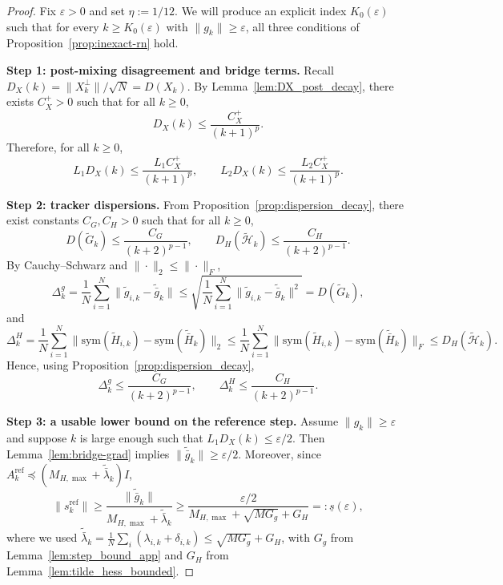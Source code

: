 \documentclass[11pt,a4paper]{article}
\begin{document}
\begin{proof}
Fix $\varepsilon>0$ and set $\eta:=1/12$.
We will produce an explicit index $K_0(\varepsilon)$ such that for every $k\ge K_0(\varepsilon)$ with $\|g_k\|\ge \varepsilon$,
all three conditions of Proposition~\ref{prop:inexact-rn} hold.

\smallskip
\noindent\textbf{Step 1: post-mixing disagreement and bridge terms.}
Recall $D_X(k)=\|X_k^\perp\|/\sqrt N = D(X_k)$.
By Lemma~\ref{lem:DX_post_decay}, there exists $C_X^{+}>0$ such that for all $k\ge 0$,
\begin{equation}\label{eq:DX_post_decay_app}
D_X(k)\le \frac{C_X^{+}}{(k+1)^p}.
\end{equation}
Therefore, for all $k\ge 0$,
\begin{equation}\label{eq:bridge_targets_app}
L_1D_X(k)\le \frac{L_1C_X^{+}}{(k+1)^p},
\qquad
L_2D_X(k)\le \frac{L_2C_X^{+}}{(k+1)^p}.
\end{equation}

\smallskip
\noindent\textbf{Step 2: tracker dispersions.}
From Proposition~\ref{prop:dispersion_decay}, there exist constants $C_G,C_H>0$ such that for all $k\ge 0$,
\begin{equation}\label{eq:GH_decay_app}
D(\tilde G_k)\le \frac{C_G}{(k+2)^{p-1}},
\qquad
D_H(\tilde{\mathcal H}_k)\le \frac{C_H}{(k+2)^{p-1}}.
\end{equation}
By Cauchy--Schwarz and $\|\cdot\|_2\le \|\cdot\|_F$,
\[
\Delta_k^g
=\frac1N\sum_{i=1}^N\|\tilde g_{i,k}-\tilde{\bar g}_k\|
\le \sqrt{\frac1N\sum_{i=1}^N\|\tilde g_{i,k}-\tilde{\bar g}_k\|^2}
= D(\tilde G_k),
\]
and
\[
\Delta_k^H
=\frac1N\sum_{i=1}^N\big\|\mathrm{sym}(\tilde H_{i,k})-\mathrm{sym}(\tilde{\bar H}_k)\big\|_2
\le \frac1N\sum_{i=1}^N\big\|\mathrm{sym}(\tilde H_{i,k})-\mathrm{sym}(\tilde{\bar H}_k)\big\|_F
\le D_H(\tilde{\mathcal H}_k).
\]
Hence, using Proposition~\ref{prop:dispersion_decay},
\begin{equation}\label{eq:Delta_decay_app}
\Delta_k^g\le \frac{C_G}{(k+2)^{p-1}},
\qquad
\Delta_k^H\le \frac{C_H}{(k+2)^{p-1}}.
\end{equation}

\smallskip
\noindent\textbf{Step 3: a usable lower bound on the reference step.}
Assume $\|g_k\|\ge \varepsilon$ and suppose $k$ is large enough such that $L_1D_X(k)\le \varepsilon/2$.
Then Lemma~\ref{lem:bridge-grad} implies
$\|\tilde{\bar g}_k\|\ge \varepsilon/2$.
Moreover, since $A_k^{\mathrm{ref}}\preceq (M_{H,\max}+\tilde{\bar\lambda}_k)I$,
\[
\|s_k^{\mathrm{ref}}\|
\ge \frac{\|\tilde{\bar g}_k\|}{M_{H,\max}+\tilde{\bar\lambda}_k}
\ge \frac{\varepsilon/2}{M_{H,\max}+\sqrt{MG_g}+G_H}
=:\underline s(\varepsilon),
\]
where we used $\tilde{\bar\lambda}_k=\frac{1}{N}\sum_i(\lambda_{i,k}+\delta_{i,k})\le \sqrt{MG_g}+G_H$, with $G_g$ from Lemma~\ref{lem:step_bound_app} and $G_H$ from Lemma~\ref{lem:tilde_hess_bounded}.


\end{proof}
\end{document}
